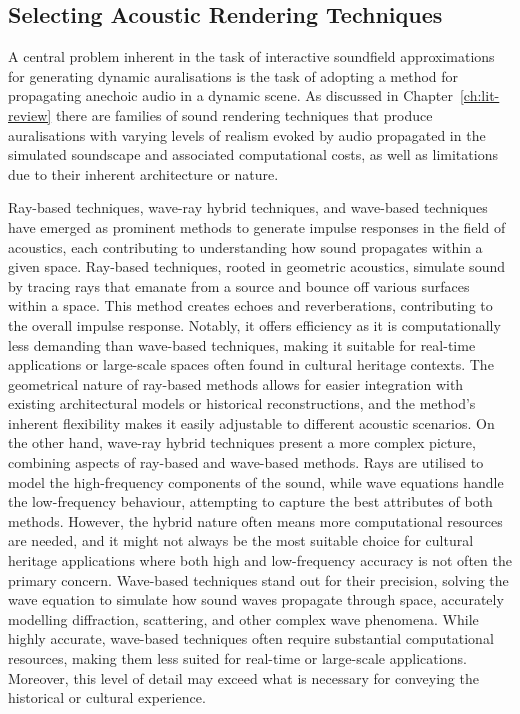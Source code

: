 \subsection{Selecting Acoustic Rendering Techniques}
A central problem inherent in the task of interactive soundfield approximations for generating dynamic auralisations is the task of adopting a method for propagating anechoic audio in a dynamic scene. As discussed in Chapter~\ref{ch:lit-review} there are families of sound rendering techniques that produce auralisations with varying levels of realism evoked by audio propagated in the simulated soundscape and associated computational costs, as well as limitations due to their inherent architecture or nature.\par
Ray-based techniques, wave-ray hybrid techniques, and wave-based techniques have emerged as prominent methods to generate impulse responses in the field of acoustics, each contributing to understanding how sound propagates within a given space. Ray-based techniques, rooted in geometric acoustics, simulate sound by tracing rays that emanate from a source and bounce off various surfaces within a space. This method creates echoes and reverberations, contributing to the overall impulse response. Notably, it offers efficiency as it is computationally less demanding than wave-based techniques, making it suitable for real-time applications or large-scale spaces often found in cultural heritage contexts. The geometrical nature of ray-based methods allows for easier integration with existing architectural models or historical reconstructions, and the method's inherent flexibility makes it easily adjustable to different acoustic scenarios. %
On the other hand, wave-ray hybrid techniques present a more complex picture, combining aspects of ray-based and wave-based methods. Rays are utilised to model the high-frequency components of the sound, while wave equations handle the low-frequency behaviour, attempting to capture the best attributes of both methods. However, the hybrid nature often means more computational resources are needed, and it might not always be the most suitable choice for cultural heritage applications where both high and low-frequency accuracy is not often the primary concern.  %
Wave-based techniques stand out for their precision, solving the wave equation to simulate how sound waves propagate through space, accurately modelling diffraction, scattering, and other complex wave phenomena. While highly accurate, wave-based techniques often require substantial computational resources, making them less suited for real-time or large-scale applications. Moreover, this level of detail may exceed what is necessary for conveying the historical or cultural experience.
